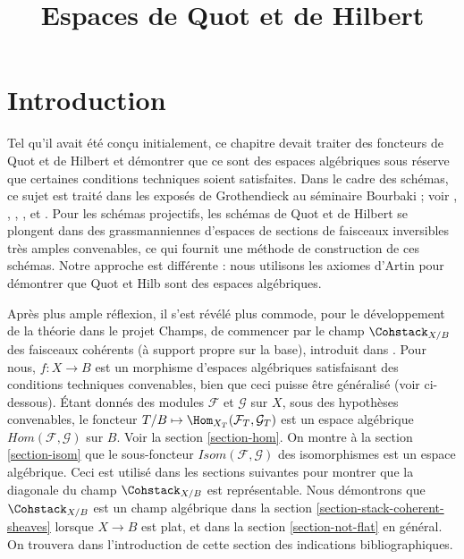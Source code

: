 

%


\title{Espaces de Quot et de Hilbert}

\maketitle

\label{section-phantom}

\tableofcontents




\section{Introduction}
\label{section-introduction}

\noindent
Tel qu'il avait été conçu initialement, ce chapitre devait traiter des
foncteurs de Quot et de Hilbert et démontrer que ce sont des espaces
algébriques sous réserve que certaines conditions techniques soient
satisfaites. Dans le cadre des schémas, ce sujet est traité dans les exposés
de Grothendieck au s\'eminaire Bourbaki ; voir
\cite{Gr-I},
\cite{Gr-II},
\cite{Gr-III},
\cite{Gr-IV},
\cite{Gr-V} et
\cite{Gr-VI}. Pour les schémas projectifs, les schémas de Quot et de Hilbert
se plongent dans des grassmanniennes d'espaces de sections de faisceaux
inversibles très amples convenables, ce qui fournit une méthode de
construction de ces schémas. Notre approche est différente : nous utilisons
les axiomes d'Artin pour démontrer que Quot et Hilb sont des espaces
algébriques.

\medskip\noindent
Après plus ample réflexion, il s'est révélé plus commode, pour le
développement de la théorie dans le projet Champs, de commencer par le champ
$\Cohstack_{X/B}$ des faisceaux cohérents (à support propre sur la base),
introduit dans \cite{lieblich_remarks}. Pour nous, $f : X \to B$ est un
morphisme d'espaces algébriques satisfaisant des conditions techniques
convenables, bien que ceci puisse être généralisé (voir ci-dessous). Étant
donnés des modules $\mathcal{F}$ et $\mathcal{G}$ sur $X$, sous des
hypothèses convenables, le foncteur
$T/B \mapsto \Hom_{X_T}(\mathcal{F}_T, \mathcal{G}_T)$ est un espace
algébrique $\mathit{Hom}(\mathcal{F}, \mathcal{G})$ sur $B$. Voir la
section \ref{section-hom}. On montre à la section \ref{section-isom} que le
sous-foncteur $\mathit{Isom}(\mathcal{F}, \mathcal{G})$ des isomorphismes est
un espace algébrique. Ceci est utilisé dans les sections suivantes pour
montrer que la diagonale du champ $\Cohstack_{X/B}$ est représentable. Nous
démontrons que $\Cohstack_{X/B}$ est un champ algébrique dans la section
\ref{section-stack-coherent-sheaves} lorsque $X \to B$ est plat, et dans la
section \ref{section-not-flat} en général. On trouvera dans l'introduction de
cette section des indications bibliographiques.

